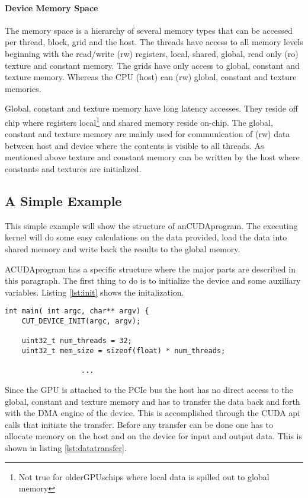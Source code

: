 \paragraph{Device Memory Space} %
\label{par:device_memory_space}
The memory space is a hierarchy of several memory types that can be accessed per
thread, block, grid and the host. The threads have access to all memory levels
beginning with the read/write (rw) registers, local, shared, global, read only
(ro) texture and constant memory. The grids have only access to global, constant
and texture memory. Whereas the CPU (host) can (rw) global, constant and texture
memories.

Global, constant and texture memory have long latency accesses. They reside off
chip where registers local\footnote{Not true for older\glspl{GPU}chips where local
data is spilled out to global memory} and shared memory reside on-chip. The
global, constant and texture memory are mainly used for communication of (rw)
data between host and device where the contents is visible to all threads. As
mentioned above texture and constant memory can be written by the host where
constants and textures are initialized.


\subsection*{A Simple Example} %
\label{sub:a_simple_example}
This simple example will show the structure of an\gls{CUDA}program. The executing
kernel will do some easy calculations on the data provided, load the data into
shared memory  and write back the results to the global memory. 

A\gls{CUDA}program has a specific structure where the major parts are described in
this paragraph. The first thing to do is to initialize the device and some
auxiliary variables. Listing \autoref{lst:init} shows the initalization.

%
\begin{lstlisting}[caption=Hardware initalization, label=lst:init]
int main( int argc, char** argv) {
	CUT_DEVICE_INIT(argc, argv);

	uint32_t num_threads = 32;
	uint32_t mem_size = sizeof(float) * num_threads;
	    							
                  ...
\end{lstlisting}
%

Since the \gls{GPU} is attached to the PCIe bus the host has no direct access to 
the global, constant and texture memory and has to transfer the data back
and forth with the DMA engine of the device. This is accomplished through the 
CUDA api calls that initiate the transfer. Before any transfer can be done
one has to allocate memory on the host and on the device for input and output
data. This is shown in listing \autoref{lst:datatransfer}.


